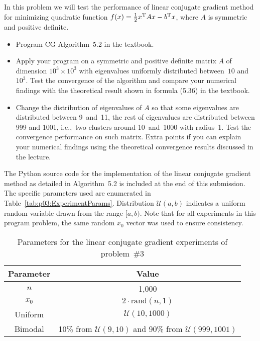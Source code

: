 \begin{problem}
  In this problem we will test the performance of linear conjugate gradient method for minimizing quadratic function $f(x) = \frac{1}{2}x^{\textnormal{T}} Ax - b ^{\textnormal{T}} x$, where $A$ is symmetric and positive definite.

  \begin{itemize}
    \item Program CG Algorithm~5.2 in the textbook.

    \item Apply your program on a symmetric and positive definite matrix $A$ of dimension $10^{3} \times 10^{3}$ with eigenvalues uniformly distributed between~$10$ and~$10^3$. Test the convergence of the algorithm and compare your numerical findings with the theoretical result shown in formula (5.36) in the textbook.

    \item Change the distribution of eigenvalues of $A$ so that some eigenvalues are distributed between 9~and~11, the rest of eigenvalues are distributed between 999 and 1001, i.e.,~two clusters around 10~and~1000 with radius~1. Test the convergence performance on such matrix. Extra points if you can explain your numerical findings using the theoretical convergence results discussed in the lecture.
  \end{itemize}
\end{problem}

The Python source code for the implementation of the linear conjugate gradient method as detailed in Algorithm~5.2 is included at the end of this submission.  The specific parameters used are enumerated in Table~\ref{tab:p03:ExperimentParams}.  Distribution $\mathcal{U}(a,b)$ indicates a uniform random variable drawn from the range $[a,b)$.  Note that for all experiments in this program problem, the same random $x_0$ vector was used to ensure consistency.

\begin{table}[h]
  \centering
  \caption{Parameters for the linear conjugate gradient experiments of problem~\#3}
  \begin{tabular}{|c|c|}
    \hline
    \textbf{Parameter} & \textbf{Value} \\
    \hline\hline
    $n$ & 1,000 \\ \hline
    $x_0$ & $2\cdot\text{rand}(n,1)$ \\ \hline
    Uniform & $\mathcal{U}(10,1000)$ \\ \hline
    Bimodal & 10\% from $\mathcal{U}(9,10)$ and 90\% from $\mathcal{U}(999,1001)$\\ \hline
  \end{tabular}
\end{table}

